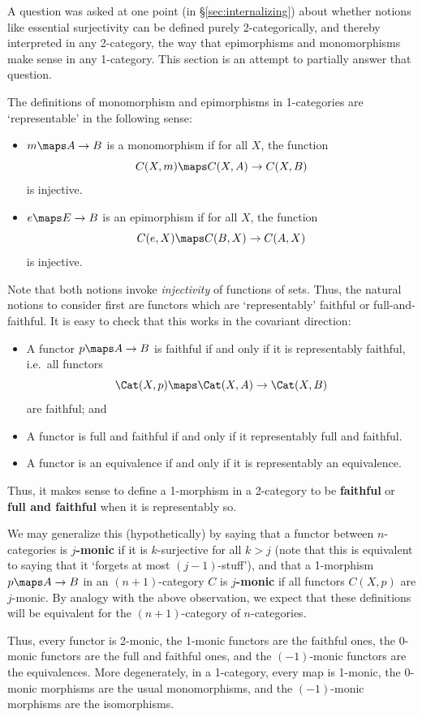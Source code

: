 \documentclass{amsart}
\begin{document}
A question was asked at one point (in \S\ref{sec:internalizing}) about
whether notions like essential surjectivity can be defined purely
2-categorically, and thereby interpreted in any 2-category, the way
that epimorphisms and monomorphisms make sense in any 1-category.
This section is an attempt to partially answer that question.

The definitions of monomorphism and epimorphisms in 1-categories are
`representable' in the following sense:
\begin{itemize}
\item $m\maps A\to B$ is a monomorphism if for all $X$, the
  function
  \[C(X,m)\maps C(X,A)\to C(X,B)\]
  is injective.
\item $e\maps E\to B$ is an epimorphism if for all $X$,
  the function 
  \[C(e,X)\maps C(B,X)\to C(A,X)\]
  is injective.
\end{itemize}

Note that both notions invoke \emph{injectivity} of functions of sets.
Thus, the natural notions to consider first are functors which are
`representably' faithful or full-and-faithful.  It is easy to check
that this works in the covariant direction:
\begin{itemize}
\item A functor $p\maps A\to B$ is faithful if and only if it is
  representably faithful, i.e.\ all functors
  \[\Cat(X,p)\maps \Cat(X,A)\to \Cat(X,B)\]
  are faithful; and
\item A functor is full and faithful if and only if it representably
  full and faithful.
\item A functor is an equivalence if and only if it is representably
  an equivalence.
\end{itemize}
Thus, it makes sense to define a 1-morphism in a 2-category to be
\textbf{faithful} or \textbf{full and faithful} when it is representably
so.

We may generalize this (hypothetically) by saying that a functor
between $n$-categories is \textbf{$j$-monic} if it is $k$-surjective for
all $k > j$ (note that this is equivalent to saying that it `forgets
at most $(j-1)$-stuff'), and that a 1-morphism $p\maps A\to B$ in an
$(n+1)$-category $C$ is \textbf{$j$-monic} if all functors $C(X,p)$ are
$j$-monic.  By analogy with the above observation, we expect that
these definitions will be equivalent for the $(n+1)$-category of
$n$-categories.

Thus, every functor is 2-monic, the 1-monic functors are the faithful
ones, the 0-monic functors are the full and faithful ones, and the
$(-1)$-monic functors are the equivalences.  More degenerately, in a
1-category, every map is 1-monic, the 0-monic morphisms are the usual
monomorphisms, and the $(-1)$-monic morphisms are the isomorphisms.
\end{document}
